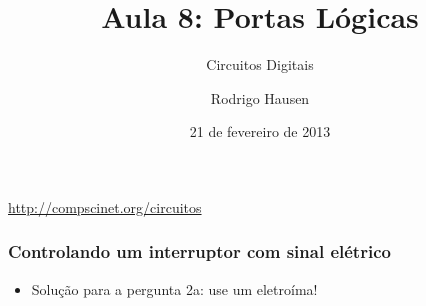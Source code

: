 \documentclass{beamer}
\title{Aula 8: Portas Lógicas}
\subtitle{Circuitos Digitais}
\author{Rodrigo Hausen}
\institute{CMCC -- UFABC}
\date{21 de fevereiro de 2013}
\begin{document}
\begin{frame}
\maketitle

\vspace{-1cm}

\begin{center}
\url{http://compscinet.org/circuitos}
\end{center}

\end{frame}


\begin{frame}
\frametitle{Controlando um interruptor com sinal elétrico}

\begin{itemize}
\item Solução para a pergunta 2a: use um eletroíma!
\end{itemize}


\end{frame}
\end{document}
